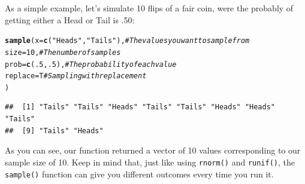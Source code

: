 \documentclass{tufte-book}\usepackage[]{graphicx}\usepackage[]{color}
\makeatletter
\newcommand{\hlnum}[1]{\textcolor[rgb]{0.686,0.059,0.569}{#1}}%
\newcommand{\hlstr}[1]{\textcolor[rgb]{0.192,0.494,0.8}{#1}}%
\newcommand{\hlcom}[1]{\textcolor[rgb]{0.678,0.584,0.686}{\textit{#1}}}%
\newcommand{\hlstd}[1]{\textcolor[rgb]{0.345,0.345,0.345}{#1}}%
\newcommand{\hlkwc}[1]{\textcolor[rgb]{0.333,0.667,0.333}{#1}}%
\newcommand{\hlkwd}[1]{\textcolor[rgb]{0.737,0.353,0.396}{\textbf{#1}}}%
\newenvironment{kframe}{%
 \def\at@end@of@kframe{}%
 \ifinner\ifhmode%
  \def\at@end@of@kframe{\end{minipage}}%
  \begin{minipage}{\columnwidth}%
 \fi\fi%
 \def\FrameCommand##1{\hskip\@totalleftmargin \hskip-\fboxsep
 \colorbox{shadecolor}{##1}\hskip-\fboxsep
     \hskip-\linewidth \hskip-\@totalleftmargin \hskip\columnwidth}%
 \MakeFramed {\advance\hsize-\width
   \@totalleftmargin\z@ \linewidth\hsize
   \@setminipage}}%
 {\par\unskip\endMakeFramed%
 \at@end@of@kframe}
\newenvironment{knitrout}{}{} %
\makeatother
\begin{document}
As a simple example, let's simulate 10 flips of a fair coin, were the probably of getting either a Head or Tail is .50:

\begin{footnotesize}
\begin{knitrout}
\color{fgcolor}\begin{kframe}
\begin{alltt}
\hlkwd{sample}\hlstd{(}\hlkwc{x} \hlstd{=} \hlkwd{c}\hlstd{(}\hlstr{"Heads"}\hlstd{,} \hlstr{"Tails"}\hlstd{),} \hlcom{# The values you want to sample from}
       \hlkwc{size} \hlstd{=} \hlnum{10}\hlstd{,}  \hlcom{# The number of samples}
       \hlkwc{prob} \hlstd{=} \hlkwd{c}\hlstd{(}\hlnum{.5}\hlstd{,} \hlnum{.5}\hlstd{),} \hlcom{# The probability of each value}
       \hlkwc{replace} \hlstd{= T} \hlcom{# Sampling with replacement}
       \hlstd{)}
\end{alltt}
\begin{verbatim}
##  [1] "Tails" "Tails" "Heads" "Tails" "Tails" "Heads" "Heads" "Tails"
##  [9] "Tails" "Heads"
\end{verbatim}
\end{kframe}
\end{knitrout}
\end{footnotesize}

As you can see, our function returned a vector of 10 values corresponding to our sample size of 10. Keep in mind that, just like using \texttt{rnorm()} and \texttt{runif()}, the \texttt{sample()} function can give you different outcomes every time you run it.
\end{document}
